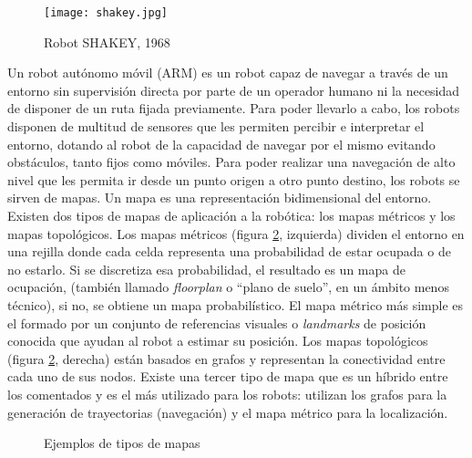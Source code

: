 \begin{figure}[h]
	\begin{center} 
	\texttt{[image: shakey.jpg]}
	\end{center}
	\caption{Robot SHAKEY, 1968 \cite{shakey2}}
	\label{fig:shakey}
\end{figure}


Un robot autónomo móvil (ARM) es un robot capaz de navegar a través de un entorno sin supervisión directa por parte de un operador humano ni la necesidad de disponer de un ruta fijada previamente. Para poder llevarlo a cabo, los robots disponen de multitud de sensores que les permiten percibir e interpretar el entorno, dotando al robot de la capacidad de navegar por el mismo evitando obstáculos, tanto fijos como móviles. Para poder realizar una navegación de alto nivel que les permita ir desde un punto origen a otro punto destino, los robots se sirven de mapas. Un mapa es una representación bidimensional del entorno. Existen dos tipos de mapas de aplicación a la robótica: los mapas métricos y los mapas topológicos. Los mapas métricos (figura \ref{fig:mapas}, izquierda) dividen el entorno en una rejilla donde cada celda representa una probabilidad de estar ocupada o de no estarlo. Si se discretiza esa probabilidad, el resultado es un mapa de ocupación, (también llamado \textit{floorplan} o ``plano de suelo'', en un ámbito menos técnico), si no, se obtiene un mapa probabilístico. El mapa métrico más simple es el formado por un conjunto de referencias visuales o \textit{landmarks} de posición conocida que ayudan al robot a estimar su posición. Los mapas topológicos (figura \ref{fig:mapas}, derecha) están basados en grafos y representan la conectividad entre cada uno de sus nodos. Existe una tercer tipo de mapa que es un híbrido entre los comentados y es el más utilizado para los robots: utilizan los grafos para la generación de trayectorias (navegación) y el mapa métrico para la localización.\\

\begin{figure}[H]
 \centering
  \hspace{2cm}
 \caption{Ejemplos de tipos de mapas}
 \label{fig:mapas}
\end{figure}

